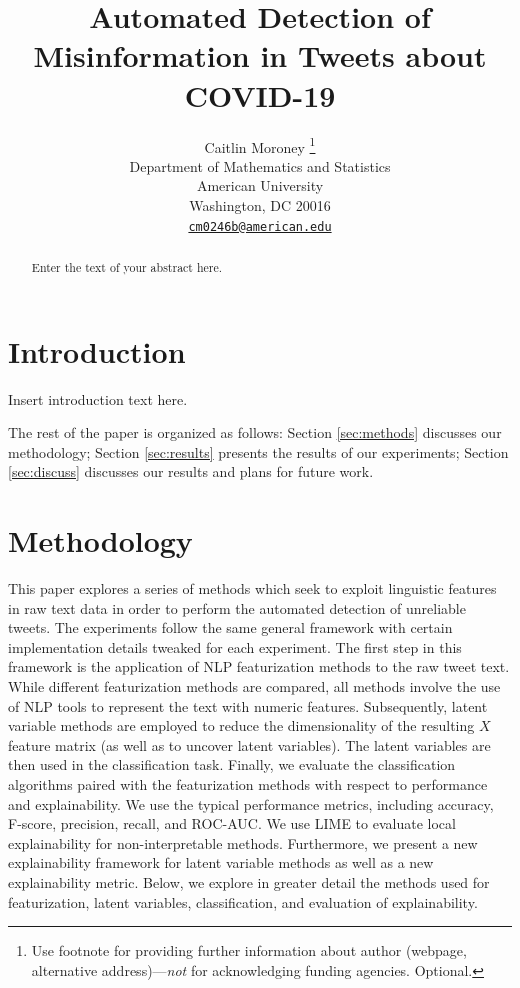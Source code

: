 \documentclass{article}
\title{Automated Detection of Misinformation in Tweets about COVID-19}
\author{
    Caitlin Moroney
    \thanks{Use footnote for providing further information about author (webpage,
alternative address)---\emph{not} for acknowledging funding agencies.
Optional.}
   \\
    Department of Mathematics and Statistics \\
    American University \\
  Washington, DC 20016 \\
  \texttt{\href{mailto:cm0246b@american.edu}{\nolinkurl{cm0246b@american.edu}}} \\
  }
\begin{document}
\maketitle

\def\tightlist{}


\begin{abstract}
Enter the text of your abstract here.
\end{abstract}


\hypertarget{introduction}{%
\section{Introduction}\label{introduction}}

Insert introduction text here.

The rest of the paper is organized as follows: Section \ref{sec:methods}
discusses our methodology; Section \ref{sec:results} presents the
results of our experiments; Section \ref{sec:discuss} discusses our
results and plans for future work.

\hypertarget{methodology}{%
\section{Methodology}\label{methodology}}

\label{sec:methods} This paper explores a series of methods which seek
to exploit linguistic features in raw text data in order to perform the
automated detection of unreliable tweets. The experiments follow the
same general framework with certain implementation details tweaked for
each experiment. The first step in this framework is the application of
NLP featurization methods to the raw tweet text. While different
featurization methods are compared, all methods involve the use of NLP
tools to represent the text with numeric features. Subsequently, latent
variable methods are employed to reduce the dimensionality of the
resulting \(X\) feature matrix (as well as to uncover latent variables).
The latent variables are then used in the classification task. Finally,
we evaluate the classification algorithms paired with the featurization
methods with respect to performance and explainability. We use the
typical performance metrics, including accuracy, F-score, precision,
recall, and ROC-AUC. We use LIME to evaluate local explainability for
non-interpretable methods. Furthermore, we present a new explainability
framework for latent variable methods as well as a new explainability
metric. Below, we explore in greater detail the methods used for
featurization, latent variables, classification, and evaluation of
explainability.
\end{document}
